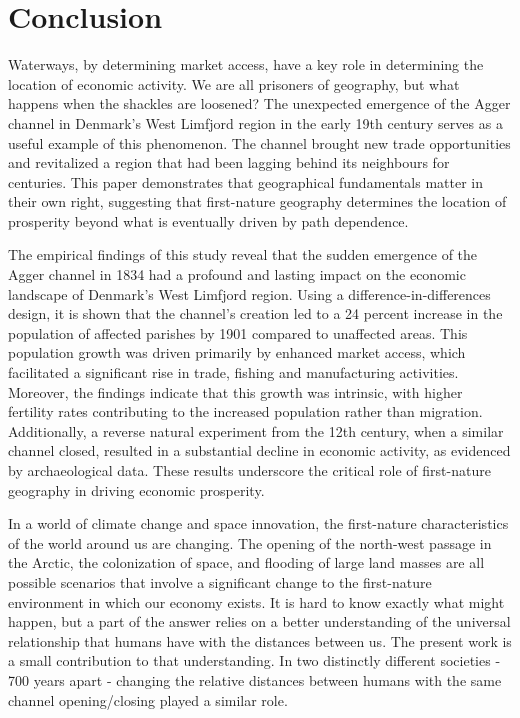 \documentclass[11pt]{article}
\begin{document}
\begin{landscape}
\begin{table}
{}
\end{table}
\end{landscape}

\FloatBarrier
\section{Conclusion}
Waterways, by determining market access, have a key role in determining the location of economic activity. We are all prisoners of geography, but what happens when the shackles are loosened? The unexpected emergence of the Agger channel in Denmark's West Limfjord region in the early 19th century serves as a useful example of this phenomenon. The channel brought new trade opportunities and revitalized a region that had been lagging behind its neighbours for centuries. This paper demonstrates that geographical fundamentals matter in their own right, suggesting that first-nature geography determines the location of prosperity beyond what is eventually driven by path dependence.

The empirical findings of this study reveal that the sudden emergence of the Agger channel in 1834 had a profound and lasting impact on the economic landscape of Denmark's West Limfjord region. Using a difference-in-differences design, it is shown that the channel's creation led to a 24 percent increase in the population of affected parishes by 1901 compared to unaffected areas. This population growth was driven primarily by enhanced market access, which facilitated a significant rise in trade, fishing and manufacturing activities. Moreover, the findings indicate that this growth was intrinsic, with higher fertility rates contributing to the increased population rather than migration. Additionally, a reverse natural experiment from the 12th century, when a similar channel closed, resulted in a substantial decline in economic activity, as evidenced by archaeological data. These results underscore the critical role of first-nature geography in driving economic prosperity.

In a world of climate change and space innovation, the first-nature characteristics of the world around us are changing. The opening of the north-west passage in the Arctic, the colonization of space, and flooding of large land masses are all possible scenarios that involve a significant change to the first-nature environment in which our economy exists. It is hard to know exactly what might happen, but a part of the answer relies on a better understanding of the universal relationship that humans have with the distances between us. The present work is a small contribution to that understanding. In two distinctly different societies - 700 years apart - changing the relative distances between humans with the same channel opening/closing played a similar role. 
\end{document}
